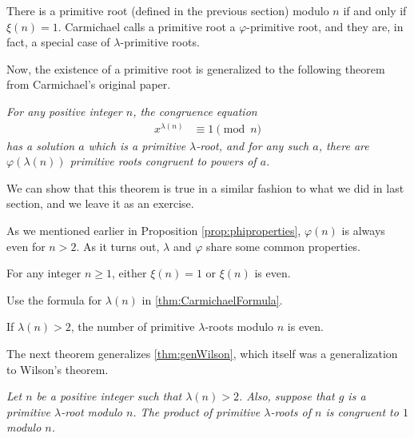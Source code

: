 \documentclass{subfile}
\begin{document}
	\begin{proposition}
		 There is a primitive root (defined in the previous section) modulo $n$ if and only if $\xi(n)=1$. Carmichael calls a primitive root a $\varphi$-primitive root, and they are, in fact, a special case of $\lambda$-primitive roots.
	\end{proposition}

	Now, the existence of a primitive root is generalized to the following theorem from Carmichael's original paper.
	\begin{theorem}[Carmicahel]\slshape
		For any positive integer $n$, the congruence equation
			\begin{align*}
				x^{\lambda(n)} & \equiv1\pmod n
			\end{align*}
		has a solution $a$ which is a primitive $\lambda$-root, and for any such $a$, there are $\varphi(\lambda(n))$ primitive roots congruent to powers of $a$.
	\end{theorem}
	We can show that this theorem is true in a similar fashion to what we did in last section, and we leave it as an exercise.

	As we mentioned earlier in Proposition \ref{prop:phiproperties}, $\varphi(n)$ is always even for $n>2$. As it turns out, $\lambda$ and $\varphi$ share some common properties.
	\begin{problem}
		For any integer $n\geq 1$, either $\xi(n)=1$ or $\xi(n)$ is even.
	\end{problem}

	\begin{hint}
		Use the formula for $\lambda(n)$ in \autoref{thm:CarmichaelFormula}.
	\end{hint}

	\begin{problem}
		If $\lambda(n)>2$, the number of primitive $\lambda$-roots modulo $n$ is even.
	\end{problem}

	The next theorem generalizes \autoref{thm:genWilson}, which itself was a generalization to Wilson's theorem.
	\begin{theorem}\slshape
		Let $n$ be a positive integer such that $\lambda(n)>2$. Also, suppose that $g$ is a primitive $\lambda$-root modulo $n$. The product of primitive $\lambda$-roots of $n$ is congruent to $1$ modulo $n$.
	\end{theorem}
\end{document}
